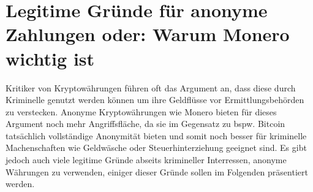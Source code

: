 \chapter{Legitime Gründe für anonyme Zahlungen oder: Warum Monero wichtig ist} \label {reasons}
Kritiker von Kryptowährungen führen oft das Argument an, dass diese durch Kriminelle genutzt werden können um ihre Geldflüsse vor Ermittlungsbehörden zu verstecken. Anonyme Kryptowährungen wie Monero 
bieten für dieses Argument noch mehr Angriffsfläche, da sie im Gegensatz zu bspw. Bitcoin tatsächlich vollständige Anonymität bieten und somit noch besser für kriminelle Machenschaften wie Geldwäsche oder
Steuerhinterziehung geeignet sind. Es gibt jedoch auch viele legitime Gründe abseits krimineller Interressen, anonyme Währungen zu verwenden, einiger dieser Gründe sollen im Folgenden präsentiert werden.
